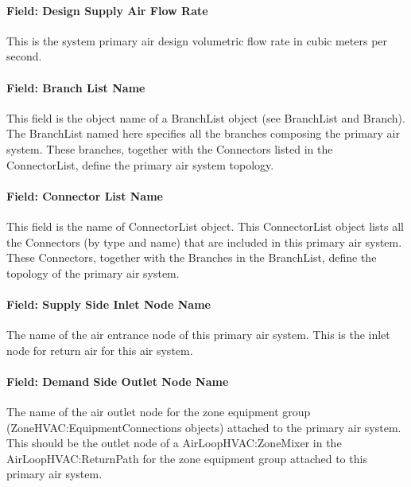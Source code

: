 \paragraph{Field: Design Supply Air Flow Rate}\label{field-design-supply-air-flow-rate}

This is the system primary air design volumetric flow rate in cubic meters per second.

\paragraph{Field: Branch List Name}\label{field-branch-list-name}

This field is the object name of a BranchList object (see BranchList and Branch). The BranchList named here specifies all the branches composing the primary air system. These branches, together with the Connectors listed in the ConnectorList, define the primary air system topology.

\paragraph{Field: Connector List Name}\label{field-connector-list-name}

This field is the name of ConnectorList object. This ConnectorList object lists all the Connectors (by type and name) that are included in this primary air system. These Connectors, together with the Branches in the BranchList, define the topology of the primary air system.

\paragraph{Field: Supply Side Inlet Node Name}\label{field-supply-side-inlet-node-name}

The name of the air entrance node of this primary air system. This is the inlet node for return air for this air system.

\paragraph{Field: Demand Side Outlet Node Name}\label{field-demand-side-outlet-node-name}

The name of the air outlet node for the zone equipment group (ZoneHVAC:EquipmentConnections objects) attached to the primary air system. This should be the outlet node of a AirLoopHVAC:ZoneMixer in the AirLoopHVAC:ReturnPath for the zone equipment group attached to this primary air system.

